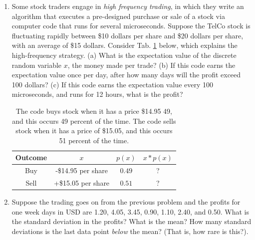 \documentclass{article}
\begin{document}
\begin{enumerate}
\item Some stock traders engage in \textit{high frequency trading}, in which they write an algorithm that executes a pre-designed purchase or sale of a stock via computer code that runs for several microseconds.  Suppose the TelCo stock is fluctuating rapidly between \$10 dollars per share and \$20 dollars per share, with an average of \$15 dollars. Consider Tab. \ref{tab:stock} below, which explains the high-frequency strategy.  (a) What is the expectation value of the discrete random variable $x$, the money made per trade? (b) If this code earns the expectation value once per day, after how many days will the profit exceed 100 dollars?  (c) If this code earns the expectation value every 100 microseconds, and runs for 12 hours, what is the profit?
\begin{table}[ht]
\centering
\begin{tabular}{| c | c | c | c |}
\hline
\textbf{Outcome} & $x$ & $p(x)$ & $x*p(x)$ \\ \hline \hline
Buy & -\$14.95 per share & $0.49$ & ? \\ \hline
Sell & +\$15.05 per share & $0.51$ & ? \\ \hline
\hline
\end{tabular}
\caption{\label{tab:stock} The code buys stock when it has a price \$14.95 49, and this occurs 49 percent of the time.  The code sells stock when it has a price of \$15.05, and this occurs 51 percent of the time.} \vspace{2cm}
\end{table}
\item Suppose the trading goes on from the previous problem and the profits for one week days in USD are 1.20, 4.05, 3.45, 0.90, 1.10, 2.40, and 0.50.  What is the standard deviation in the profits?  What is the mean?  How many standard deviations is the last data point \textit{below} the mean?  (That is, how rare is this?).
\end{enumerate}
\end{document}
